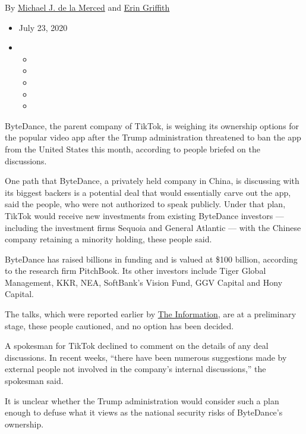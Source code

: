 By
\href{https://www.nytimes3xbfgragh.onion/by/michael-j-de-la-merced}{Michael
J. de la Merced} and
\href{https://www.nytimes3xbfgragh.onion/by/erin-griffith}{Erin
Griffith}

\begin{itemize}
\item
  July 23, 2020
\item
  \begin{itemize}
  \item
  \item
  \item
  \item
  \item
  \end{itemize}
\end{itemize}

ByteDance, the parent company of TikTok, is weighing its ownership
options for the popular video app after the Trump administration
threatened to ban the app from the United States this month, according
to people briefed on the discussions.

One path that ByteDance, a privately held company in China, is
discussing with its biggest backers is a potential deal that would
essentially carve out the app, said the people, who were not authorized
to speak publicly. Under that plan, TikTok would receive new investments
from existing ByteDance investors --- including the investment firms
Sequoia and General Atlantic --- with the Chinese company retaining a
minority holding, these people said.

ByteDance has raised billions in funding and is valued at \$100 billion,
according to the research firm PitchBook. Its other investors include
Tiger Global Management, KKR, NEA, SoftBank's Vision Fund, GGV Capital
and Hony Capital.

The talks, which were reported earlier by
\href{https://www.theinformation.com/articles/bytedance-investors-discuss-tiktok-purchase}{The
Information}, are at a preliminary stage, these people cautioned, and no
option has been decided.

A spokesman for TikTok declined to comment on the details of any deal
discussions. In recent weeks, ``there have been numerous suggestions
made by external people not involved in the company's internal
discussions,'' the spokesman said.

It is unclear whether the Trump administration would consider such a
plan enough to defuse what it views as the national security risks of
ByteDance's ownership.

